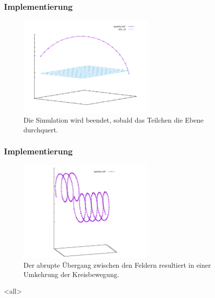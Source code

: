 \begin{frame}
  \frametitle{Implementierung}
  \begin{figure}
    \centering
    \includegraphics[width=0.6\textwidth]{../gnuplot/stop_plane}
    \caption{Die Simulation wird beendet, sobald das Teilchen die Ebene durchquert.}
    \label{fig:stop_plane}
  \end{figure}
\end{frame}

\begin{frame}
  \frametitle{Implementierung}
  \begin{figure}
    \centering
    \includegraphics[width=0.6\textwidth]{../gnuplot/two_fields}
    \caption{Der abrupte \"Ubergang zwischen den Feldern resultiert in einer Umkehrung der Kreisbewegung.}
    \label{fig:two_fields}
  \end{figure}
\end{frame}

\mode<all>
